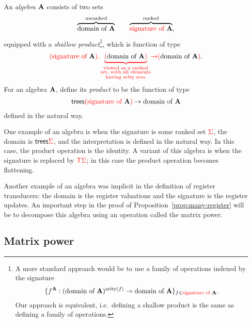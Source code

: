 \begin{definition}
    An \emph{algebra} ${\color{black}\mathbf A}$ consists of two sets 
    \begin{align*}
    \overbrace{{\color{black}\text{domain of }}{\color{black}\mathbf A}}^{\text{unranked}} \qquad \overbrace{{\color{red}{\text{signature of }}}{\color{black}\mathbf A}}^{\text{ranked}},
    \end{align*}
equipped with a  \emph{shallow product}\footnote{
    A more standard approach would be to use a family of operations indexed by the signature
    \begin{align*}
    \{f^{\color{black}\mathbf A} : ({\color{black}\text{domain of }}{\color{black}\mathbf A})^{\mathrm{arity}(f)} \to {\color{black}\text{domain of }}{\color{black}\mathbf A}\}_{f \in {\color{red}{\text{signature of }}}{\color{black}\mathbf A}}.
    \end{align*}
   Our approach is equivalent, i.e.~defining a shallow product is the same as defining a family of operations.
}, which is function of type
\begin{align*}
 {\color{red}{({\color{red}{\text{signature of }}}{\color{black}\mathbf A}) . \underbrace{({\color{black}\text{domain of }}{\color{black}\mathbf A})}_{\substack{\text{viewed as a ranked}\\ \text{set, with all elements}\\ \text{having arity zero}}}}} {\color{red}{\to}} {\color{red}{(}}{\color{black}\text{domain of }}{\color{black}\mathbf A}{\color{red}{)}}.
\end{align*}
    For an algebra ${\color{black}\mathbf A}$, define its \emph{product} to be the function of type
    \begin{align*}
        \mathsf {trees} {\color{red}{(}}{\color{red}{\text{signature of }}}{\color{black}\mathbf A}{\color{red}{)}} \to {\color{black}\text{domain of }}{\color{black}\mathbf A}
    \end{align*}
    defined in the natural way.
\end{definition}


One example of an algebra is when the signature is some ranked set ${\color{red}{\Sigma}}$, the domain is  $\mathsf {trees} {\color{red}{\Sigma}}$, and the interpretation is defined in the natural way. In this case, the product operation is the identity. A variant of this algebra is when the signature is replaced by ${\color{red}{\mathsf T}} {\color{red}{\Sigma}}$; in this case the product operation becomes flattening. 

Another example of an algebra was implicit in the definition of register transducers: the domain is the register valuations and the signature is the  register updates. An important step in the proof of Proposition~\ref{prop:many-register} will be to decompose this algebra using an operation called the matrix power.



\subsection{Matrix power} 
\label{sec:matrix-power-subsec}

